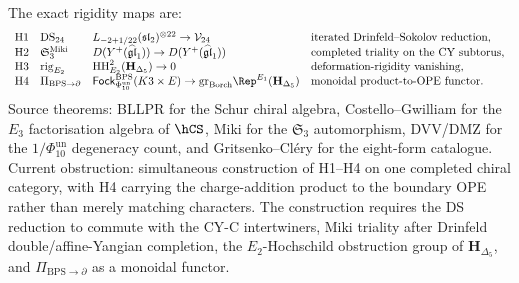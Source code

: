 \begin{theorem}
The exact rigidity maps are:
\[
\begin{array}{llll}
\textup{H1} &
\mathrm{DS}_{24} &
L_{-2+1/22}(\mathfrak{sl}_2)^{\otimes 22}\to\mathcal{V}_{24} &
\text{iterated Drinfeld--Sokolov reduction},\\
\textup{H2} &
\mathfrak{S}_3^{\mathrm{Miki}} &
D(Y^+(\widehat{\mathfrak{gl}}_1))\to D(Y^+(\widehat{\mathfrak{gl}}_1)) &
\text{completed triality on the CY subtorus},\\
\textup{H3} &
\mathrm{rig}_{E_2} &
\HH^2_{E_2}(\mathbf{H}_{\Delta_5})\to 0 &
\text{deformation-rigidity vanishing},\\
\textup{H4} &
\Pi_{\mathrm{BPS}\to\partial} &
\mathsf{Fock}^{\mathrm{BPS}}_{\Phi_{10}^{\mathrm{un}}}(K3\times E)
\to \mathrm{gr}_{\mathrm{Borch}}\Rep^{E_1}(\mathbf H_{\Delta_5}) &
\text{monoidal product-to-OPE functor}.
\end{array}
\]
Source theorems: BLLPR for the Schur chiral algebra, Costello--Gwilliam
for the $E_3$ factorisation algebra of $\hCS$, Miki for the
$\mathfrak{S}_3$ automorphism, DVV/DMZ for the
$1/\Phi_{10}^{\mathrm{un}}$ degeneracy count, and Gritsenko--Cl\'ery for the
eight-form catalogue. Current obstruction: simultaneous construction
of \textup{H1}--\textup{H4} on one completed chiral category, with
\textup{H4} carrying the charge-addition product to the boundary OPE
rather than merely matching characters. The construction requires the
DS reduction to commute with the CY-C intertwiners, Miki triality after
Drinfeld double/affine-Yangian completion, the \(E_2\)-Hochschild
obstruction group of \(\mathbf H_{\Delta_5}\), and
\(\Pi_{\mathrm{BPS}\to\partial}\) as a monoidal functor.
\end{theorem}

